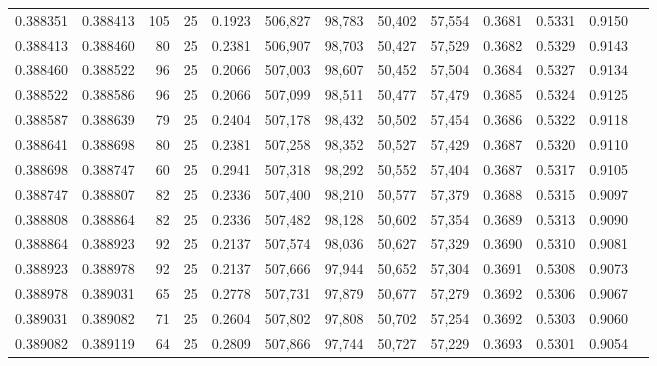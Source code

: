 \begin{tabular}{rrrrrrrrrrrrr}
0.388351 & 0.388413 &   105 &  25 &                                     0.1923 & 506,827 &  98,783 &  50,402 &  57,554 & 0.3681 & 0.5331 & 0.9150 \\
0.388413 & 0.388460 &    80 &  25 &                                     0.2381 & 506,907 &  98,703 &  50,427 &  57,529 & 0.3682 & 0.5329 & 0.9143 \\
0.388460 & 0.388522 &    96 &  25 &                                     0.2066 & 507,003 &  98,607 &  50,452 &  57,504 & 0.3684 & 0.5327 & 0.9134 \\
0.388522 & 0.388586 &    96 &  25 &                                     0.2066 & 507,099 &  98,511 &  50,477 &  57,479 & 0.3685 & 0.5324 & 0.9125 \\
0.388587 & 0.388639 &    79 &  25 &                                     0.2404 & 507,178 &  98,432 &  50,502 &  57,454 & 0.3686 & 0.5322 & 0.9118 \\
0.388641 & 0.388698 &    80 &  25 &                                     0.2381 & 507,258 &  98,352 &  50,527 &  57,429 & 0.3687 & 0.5320 & 0.9110 \\
0.388698 & 0.388747 &    60 &  25 &                                     0.2941 & 507,318 &  98,292 &  50,552 &  57,404 & 0.3687 & 0.5317 & 0.9105 \\
0.388747 & 0.388807 &    82 &  25 &                                     0.2336 & 507,400 &  98,210 &  50,577 &  57,379 & 0.3688 & 0.5315 & 0.9097 \\
0.388808 & 0.388864 &    82 &  25 &                                     0.2336 & 507,482 &  98,128 &  50,602 &  57,354 & 0.3689 & 0.5313 & 0.9090 \\
0.388864 & 0.388923 &    92 &  25 &                                     0.2137 & 507,574 &  98,036 &  50,627 &  57,329 & 0.3690 & 0.5310 & 0.9081 \\
0.388923 & 0.388978 &    92 &  25 &                                     0.2137 & 507,666 &  97,944 &  50,652 &  57,304 & 0.3691 & 0.5308 & 0.9073 \\
0.388978 & 0.389031 &    65 &  25 &                                     0.2778 & 507,731 &  97,879 &  50,677 &  57,279 & 0.3692 & 0.5306 & 0.9067 \\
0.389031 & 0.389082 &    71 &  25 &                                     0.2604 & 507,802 &  97,808 &  50,702 &  57,254 & 0.3692 & 0.5303 & 0.9060 \\
0.389082 & 0.389119 &    64 &  25 &                                     0.2809 & 507,866 &  97,744 &  50,727 &  57,229 & 0.3693 & 0.5301 & 0.9054 \\

\end{tabular}
